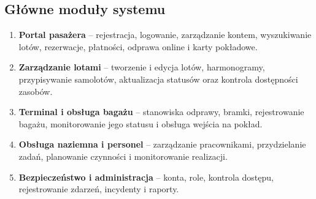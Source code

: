 \documentclass[12pt,a4paper,oneside]{report}
\begin{document}
\subsection*{Główne moduły systemu}
\begin{enumerate}
    \item \textbf{Portal pasażera} -- rejestracja, logowanie, zarządzanie kontem, wyszukiwanie lotów, rezerwacje, płatności, odprawa online i karty pokładowe.
    \item \textbf{Zarządzanie lotami} -- tworzenie i edycja lotów, harmonogramy, przypisywanie samolotów, aktualizacja statusów oraz kontrola dostępności zasobów.
    \item \textbf{Terminal i obsługa bagażu} -- stanowiska odprawy, bramki, rejestrowanie bagażu, monitorowanie jego statusu i obsługa wejścia na pokład.
    \item \textbf{Obsługa naziemna i personel} -- zarządzanie pracownikami, przydzielanie zadań, planowanie czynności i monitorowanie realizacji.
    \item \textbf{Bezpieczeństwo i administracja} -- konta, role, kontrola dostępu, rejestrowanie zdarzeń, incydenty i raporty.
\end{enumerate}
\end{document}
